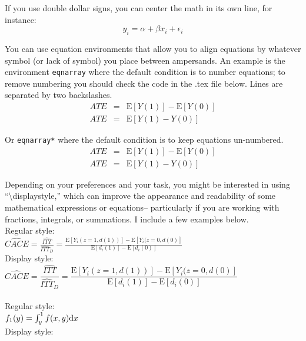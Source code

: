 \documentclass[12pt,notitlepage]{article}		%
\begin{document}
If you use double dollar signs, you can center the math in its own line, for instance: $$y_i = \alpha + \beta x_i + \epsilon_i$$

You can use equation environments that allow you to align equations by whatever symbol (or lack of symbol) you place between ampersands. An example is the environment \texttt{eqnarray} where the default condition is to number equations; to remove numbering you should check the code in the .tex file below. Lines are separated by two backslashes.
\begin{eqnarray}
ATE		&=&	\textrm{E}[Y(1)] - \textrm{E}[Y(0)]	\nonumber		\\
ATE		&=& \textrm{E}[Y(1) - Y(0)]
\end{eqnarray}

Or \texttt{eqnarray*} where the default condition is to keep equations un-numbered.
\begin{eqnarray*}
ATE		&=&	\textrm{E}[Y(1)] - \textrm{E}[Y(0)]	\\
ATE		&=& \textrm{E}[Y(1) - Y(0)]
\end{eqnarray*}

Depending on your preferences and your task, you might be interested in using ``\textbackslash displaystyle,'' which can improve the appearance and readability of some mathematical expressions or equations-- particularly if you are working with fractions, integrals, or summations.  I include a few examples below.\\

Regular style:  \\

$\widehat{CACE} = \frac{\widehat{ITT}}{\widehat{ITT}_D} = \frac{\textrm{E}[Y_i(z = 1, d(1))] - \textrm{E}[Y_i(z = 0, d(0)]}{\textrm{E}[d_i(1)] - \textrm{E}[d_i(0)]} $\\

Display style:  \\

$\widehat{CACE} = \dfrac{\widehat{ITT}}{\widehat{ITT}_D} = \dfrac{\textrm{E}[Y_i(z = 1, d(1))] - \textrm{E}[Y_i(z = 0, d(0)]}{\textrm{E}[d_i(1)] -\textrm{E}[d_i(0)]} $\\\\

Regular style:\\
 
$f_1(y) = \int_{y}^{1} f(x, y) \textup{d}x$\\

Display style:\\
\end{document}
